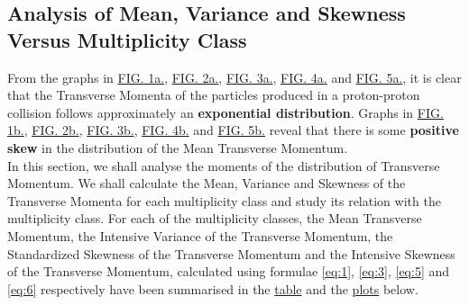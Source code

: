\documentclass[letterpaper,aps,prc,superscriptaddress,nofootinbib,10pt,showpacs,floatfix]{revtex4-2}%
\begin{document}
\subsection{Analysis of Mean, Variance and Skewness Versus Multiplicity Class}
From the graphs in \hyperref[Fig:1a]{FIG. 1a.}, \hyperref[Fig:2a]{FIG. 2a.}, \hyperref[Fig:3a]{FIG. 3a.}, \hyperref[Fig:4a]{FIG. 4a.} and \hyperref[Fig:5a]{FIG. 5a.}, it is clear that the Transverse Momenta of the particles produced in a proton-proton collision follows approximately an \textbf{exponential distribution}. Graphs in \hyperref[Fig:1b]{FIG. 1b.}, \hyperref[Fig:2b]{FIG. 2b.}, \hyperref[Fig:3b]{FIG. 3b.}, \hyperref[Fig:4b]{FIG. 4b.} and \hyperref[Fig:5b]{FIG. 5b.} reveal that there is some \textbf{positive skew} in the distribution of the Mean Transverse Momentum.
\\
In this section, we shall analyse the moments of the distribution of Transverse Momentum. We shall calculate the Mean, Variance and Skewness of the Transverse Momenta for each multiplicity class and study its relation with the multiplicity class. For each of the multiplicity classes, the Mean Transverse Momentum, the Intensive Variance of the Transverse Momentum, the Standardized Skewness of the Transverse Momentum and the Intensive Skewness of the Transverse Momentum, calculated using formulae \ref{eq:1}, \ref{eq:3}, \ref{eq:5} and \ref{eq:6} respectively have been summarised in the \hyperref[subsubsec:summary]{table} and the \hyperref[subsubsec:mean]{plots} below.

\newpage
\end{document}
